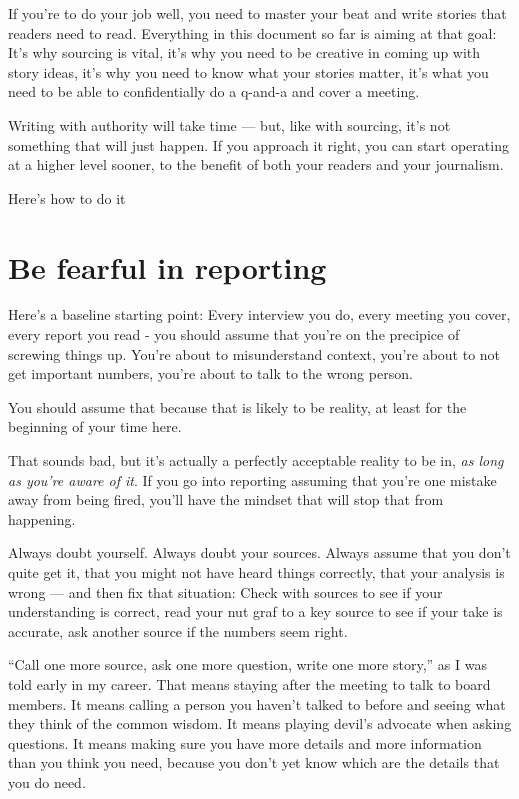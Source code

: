 \documentclass[
  11pt,
  american,
  letterpaperpaper,
  extrafontsizes,onecolumn,openright
  ]{memoir}
\newlength{\rf}
\begin{document}
If you're to do your job well, you need to master your beat and write stories that readers need to read. Everything in this document so far is aiming at that goal: It's why sourcing is vital, it's why you need to be creative in coming up with story ideas, it's why you need to know what your stories matter, it's what you need to be able to confidentially do a q-and-a and cover a meeting.

Writing with authority will take time --- but, like with sourcing, it's not something that will just happen. If you approach it right, you can start operating at a higher level sooner, to the benefit of both your readers and your journalism.

Here's how to do it

\hypertarget{be-fearful-in-reporting}{%
\section*{Be fearful in reporting}\label{be-fearful-in-reporting}}

Here's a baseline starting point: Every interview you do, every meeting you cover, every report you read - you should assume that you're on the precipice of screwing things up. You're about to misunderstand context, you're about to not get important numbers, you're about to talk to the wrong person.

You should assume that because that is likely to be reality, at least for the beginning of your time here.

That sounds bad, but it's actually a perfectly acceptable reality to be in, \emph{as long as you're aware of it}. If you go into reporting assuming that you're one mistake away from being fired, you'll have the mindset that will stop that from happening.

Always doubt yourself. Always doubt your sources. Always assume that you don't quite get it, that you might not have heard things correctly, that your analysis is wrong --- and then fix that situation: Check with sources to see if your understanding is correct, read your nut graf to a key source to see if your take is accurate, ask another source if the numbers seem right.

\enquote{Call one more source, ask one more question, write one more story,} as I was told early in my career. That means staying after the meeting to talk to board members. It means calling a person you haven't talked to before and seeing what they think of the common wisdom. It means playing devil's advocate when asking questions. It means making sure you have more details and more information than you think you need, because you don't yet know which are the details that you do need.
\end{document}

